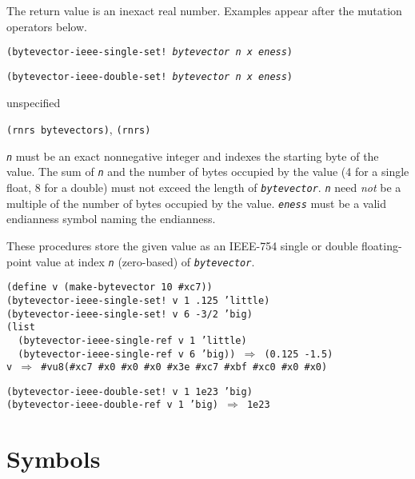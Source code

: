 The return value is an inexact real number.
Examples appear after the mutation operators below.


\begin{description}

\label{objects_s265}\item[procedure] \texttt{(bytevector-ieee-single-set! \textit{bytevector} \textit{n} \textit{x} \textit{eness})}



\item[procedure] \texttt{(bytevector-ieee-double-set! \textit{bytevector} \textit{n} \textit{x} \textit{eness})}



\item[returns] unspecified


\item[libraries] \texttt{(rnrs bytevectors)}, \texttt{(rnrs)}
\end{description}

\texttt{\textit{n}} must be an exact nonnegative integer and
indexes the starting byte of the value.
The sum of \texttt{\textit{n}} and the number of bytes occupied by the value
(4 for a single float, 8 for a double)
must not exceed the length of \texttt{\textit{bytevector}}.
\texttt{\textit{n}} need \textit{not} be a multiple of the
number of bytes occupied by the value.
\texttt{\textit{eness}} must be a valid endianness symbol naming the endianness.

These procedures store the given value as an IEEE-754 single or double
floating-point value at index \texttt{\textit{n}} (zero-based) of \texttt{\textit{bytevector}}.


\begin{alltt}
(define v (make-bytevector 10 \#{}xc7))
(bytevector-ieee-single-set! v 1 .125 'little)
(bytevector-ieee-single-set! v 6 -3/2 'big)
(list
  (bytevector-ieee-single-ref v 1 'little)
  (bytevector-ieee-single-ref v 6 'big)) \(\Rightarrow\) (0.125 -1.5)
v \(\Rightarrow\) \#{}vu8(\#{}xc7 \#{}x0 \#{}x0 \#{}x0 \#{}x3e \#{}xc7 \#{}xbf \#{}xc0 \#{}x0 \#{}x0)

(bytevector-ieee-double-set! v 1 1e23 'big)
(bytevector-ieee-double-ref v 1 'big) \(\Rightarrow\) 1e23
\end{alltt}

\section{\label{objects_g117}\label{objects_h11}Symbols\label{objects_SECTSYMBOLS}}



